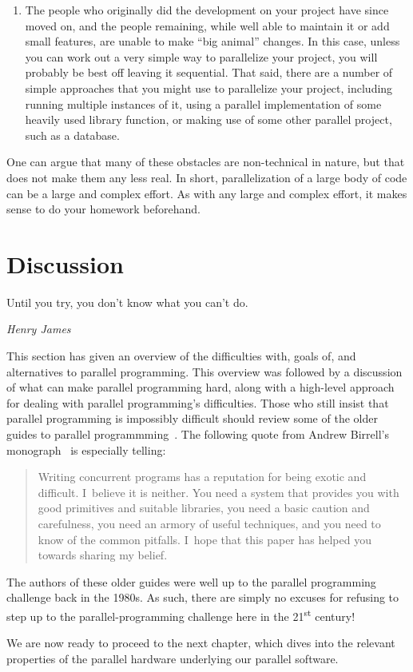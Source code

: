 {\begin{enumerate}
		development practices than are sequential environments.
		You may be well-served to clean up the existing design
		and code prior to attempting parallelization.
	\item	The people who originally did the development on your
		project have since moved on, and the people remaining,
		while well able to maintain it or add small features,
		are unable to make ``big animal'' changes.
		In this case, unless you can work out a very simple
		way to parallelize your project, you will probably
		be best off leaving it sequential.
		That said, there are a number of simple approaches that
		you might use
		to parallelize your project, including running multiple
		instances of it, using a parallel implementation of
		some heavily used library function, or making use of
		some other parallel project, such as a database.
	\end{enumerate}

	One can argue that many of these obstacles are non-technical
	in nature, but that does not make them any less real.
	In short, parallelization of a large body of code
	can be a large and complex effort.
	As with any large and complex effort, it makes sense to
	do your homework beforehand.
}\QuickQuizEnd

\section{Discussion}
\label{sec:intro:Discussion}
%
\epigraph{Until you try, you don't know what you can't do.}
	 {\emph{Henry James}}

This section has given an overview of the difficulties with, goals of,
and alternatives to parallel programming.
This overview was followed by a discussion of
what can make parallel programming hard, along with a high-level
approach for dealing with parallel programming's difficulties.
Those who still insist that parallel programming is impossibly difficult
should review some of the older guides to parallel
programmming~\cite{SQNTParallel,AndrewDBirrell1989Threads,Beck85,Inman85}.
The following quote from Andrew Birrell's
monograph~\cite{AndrewDBirrell1989Threads} is especially telling:

\begin{quote}
	Writing concurrent programs has a reputation for being exotic
	and difficult.
	I~believe it is neither.
	You need a system that provides you with good primitives
	and suitable libraries,
	you need a basic caution and carefulness, you need an armory of
	useful techniques, and you need to know of the common pitfalls.
	I~hope that this paper has helped you towards sharing my belief.
\end{quote}

The authors of these older guides were well up to the parallel programming
challenge back in the 1980s.
As such, there are simply no excuses for refusing to step up to the
parallel-programming challenge here in the 21\textsuperscript{st} century!

We are now ready to proceed to the next chapter, which dives into the
relevant properties of the parallel hardware underlying our parallel
software.

